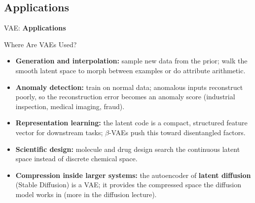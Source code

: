 \subsection{Applications}
\begin{frame}{}
	\LARGE VAE: \textbf{Applications}
\end{frame}

\begin{frame}{Where Are VAEs Used?}
\begin{itemize}
    \item \textbf{Generation and interpolation:} sample new data from the prior; walk the smooth latent space to morph between examples or do attribute arithmetic.
    \item \textbf{Anomaly detection:} train on normal data; anomalous inputs reconstruct poorly, so the reconstruction error becomes an anomaly score (industrial inspection, medical imaging, fraud).
    \item \textbf{Representation learning:} the latent code is a compact, structured feature vector for downstream tasks; $\beta$-VAEs push this toward disentangled factors.
    \item \textbf{Scientific design:} molecule and drug design search the continuous latent space instead of discrete chemical space.
    \item \textbf{Compression inside larger systems:} the autoencoder of \textbf{latent diffusion} (Stable Diffusion) is a VAE; it provides the compressed space the diffusion model works in (more in the diffusion lecture).
\end{itemize}
\end{frame}
